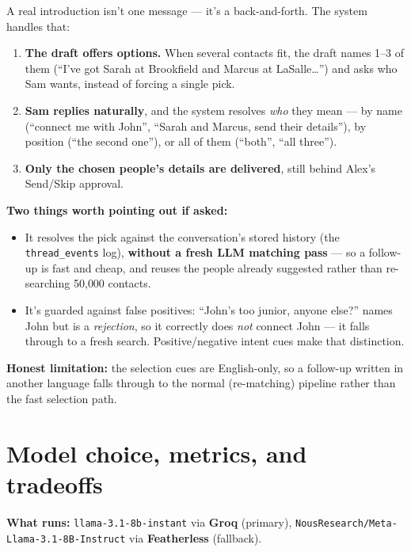 \documentclass[11pt, a4paper]{article}
\begin{document}
A real introduction isn't one message --- it's a back-and-forth. The system handles that:

\begin{enumerate}
    \item \textbf{The draft offers options.} When several contacts fit, the draft names 1--3 of them (``I've got Sarah at Brookfield and Marcus at LaSalle\ldots'') and asks who Sam wants, instead of forcing a single pick.
    \item \textbf{Sam replies naturally}, and the system resolves \emph{who} they mean --- by name (``connect me with John'', ``Sarah and Marcus, send their details''), by position (``the second one''), or all of them (``both'', ``all three'').
    \item \textbf{Only the chosen people's details are delivered}, still behind Alex's Send/Skip approval.
\end{enumerate}

\textbf{Two things worth pointing out if asked:}
\begin{itemize}
    \item It resolves the pick against the conversation's stored history (the \texttt{thread\_events} log), \textbf{without a fresh LLM matching pass} --- so a follow-up is fast and cheap, and reuses the people already suggested rather than re-searching 50{,}000 contacts.
    \item It's guarded against false positives: ``John's too junior, anyone else?'' names John but is a \emph{rejection}, so it correctly does \emph{not} connect John --- it falls through to a fresh search. Positive/negative intent cues make that distinction.
\end{itemize}

\textbf{Honest limitation:} the selection cues are English-only, so a follow-up written in another language falls through to the normal (re-matching) pipeline rather than the fast selection path.

\section{Model choice, metrics, and tradeoffs}

\textbf{What runs:} \texttt{llama-3.1-8b-instant} via \textbf{Groq} (primary), \texttt{NousResearch/Meta-Llama-3.1-8B-Instruct} via \textbf{Featherless} (fallback).
\end{document}
